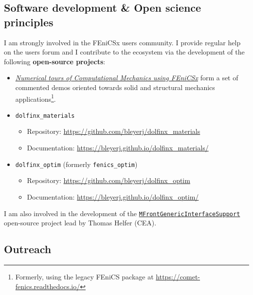 \subsection*{\textcolor{navier_blue}{Software development \& Open science principles}}
I am strongly involved in the FEniCSx users community. I provide regular help on the users forum and I contribute to the ecosystem via the development of the following \textbf{open-source projects}:
\begin{itemize}
\item  \href{https://bleyerj.github.io/comet-fenicsx/}{\textit{Numerical tours of Computational Mechanics using FEniCSx}} form a set of commented demos oriented towards solid and structural mechanics applications\footnote{Formerly, using the legacy FEniCS package at  \url{https://comet-fenics.readthedocs.io/}}.
\item \texttt{dolfinx\_materials}
\begin{itemize}
\item[] Repository: \url{https://github.com/bleyerj/dolfinx_materials}
\item[] Documentation: \url{https://bleyerj.github.io/dolfinx_materials/}
\end{itemize}
\item \texttt{dolfinx\_optim} (formerly \texttt{fenics\_optim})
\begin{itemize}
\item[] Repository: \url{https://github.com/bleyerj/dolfinx_optim}
\item[] Documentation: \url{https://bleyerj.github.io/dolfinx_optim/}
\end{itemize}
\end{itemize}

I am also involved in the development of the \href{https://thelfer.github.io/mgis/web/index.html}{\texttt{MFrontGenericInterfaceSupport}} open-source project lead by Thomas Helfer (CEA).

\subsection*{\textcolor{navier_blue}{Outreach}}

